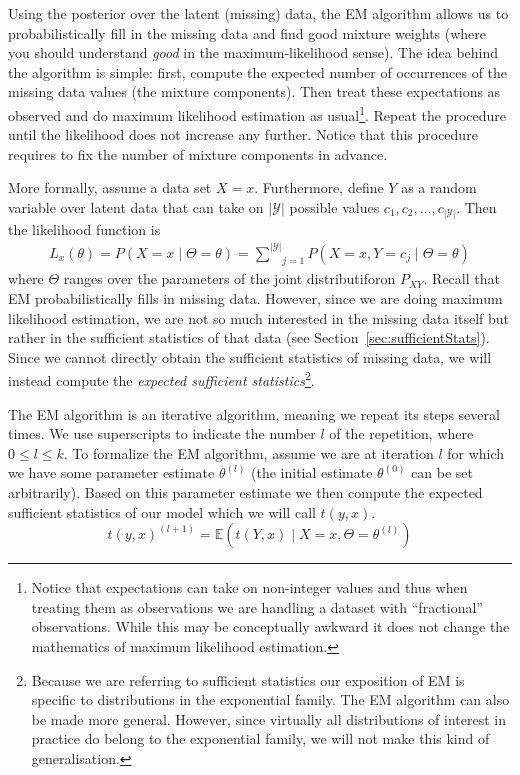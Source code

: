 \documentclass[a4paper,11pt,leqno]{report}\usepackage[]{graphicx}\usepackage[]{color}
\newcommand{\E}{\mathbb{E}}
\newcommand{\philip}[1]{ \textcolor{red}{\textbf{Philip:} #1}}
\newcommand{\chris}[1]{ \textcolor{blue}{\textbf{Chris:} #1}}
\begin{document}
Using the posterior over the latent (missing) data, the EM algorithm allows us to probabilistically fill in the missing data and find good mixture weights
(where you should understand \textit{good} in the maximum-likelihood sense). The idea behind the
algorithm is simple: first, compute the expected number of occurrences of the missing data values (the mixture 
components). Then treat these expectations as observed and do maximum likelihood estimation as usual\footnote{Notice that expectations can take on non-integer values and thus when treating them as observations we are handling a dataset with ``fractional'' observations. While this may be conceptually awkward
it does not change the mathematics of maximum likelihood estimation.}. Repeat the procedure 
until the likelihood does not increase any further. Notice that this procedure requires to
fix the number of mixture components in advance.

More formally, assume a data set $ X=x $. Furthermore, define $ Y $ as a random variable over latent data that can
take on $ |\mathcal{Y}| $ possible values $c_1, c_2, \ldots, c_{|\mathcal{Y}|}$. Then the likelihood function is 
\begin{align}
L_{x}(\theta) = P(X=x \mid \Theta=\theta) = \underset{j=1}{\overset{|\mathcal{Y}|}{\sum}} P(X=x, Y=c_{j} \mid \Theta=\theta)
\end{align}
where $ \Theta $ ranges over the parameters of the joint distributiforon $ P_{XY} $. Recall that EM
probabilistically fills in missing data. However, since we are doing maximum likelihood estimation, we
are not so much interested in the missing data itself but rather in the sufficient statistics of
that data (see Section~\ref{sec:sufficientStats}). Since we cannot directly obtain the sufficient statistics
of missing data, we will instead compute the \textit{expected sufficient statistics}\footnote{
Because we are referring to sufficient statistics our exposition of EM is specific to distributions
in the exponential family. The EM algorithm can also be made more general. However, since virtually
all distributions of interest in practice do belong to the exponential family, we will not make this kind of generalisation.
}.

The EM algorithm is an iterative 
algorithm, meaning we repeat its steps several
times. We use superscripts to indicate the number $l$ of the repetition, where $ 0 \leq l \leq k $.
To formalize the EM algorithm, assume we are at iteration $l$ for which we have some parameter estimate 
$\theta^{(l)} $ (the initial estimate $\theta^{(0)}$ can be set arbitrarily). Based on this parameter 
estimate we then compute the expected sufficient statistics of our model which we will call $ t(y,x) $.
\begin{equation} \label{Estep}
t(y,x)^{(l+1)} = \E(t(Y,x) \mid X = x,\Theta = \theta^{(l)})
\end{equation} 
\end{document}
